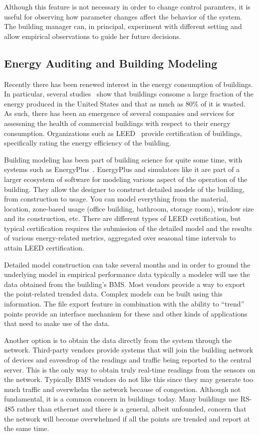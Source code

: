 Although this feature is not necessary in order to change control paramters, it is useful for observing how parameter changes
affect the behavior of the system.  The building manager can, in principal, experiment with different setting and allow
empirical observations to guide her future decisions.


\subsection{Energy Auditing and Building Modeling}
Recently there has been renewed interest in the energy consumption of buildings.  In particular, several studies~\cite{BuildingEnergyData,
MITBuildingScience} show that buildings consome a large fraction of the energy produced in the United States and that as much
as 80\% of it is wasted.  As such, there has been an emergence of several companies and services for assessning the health of
commercial buildings with respect to their energy consumption.  Organizations such as LEED~\cite{Leed} provide certification of 
buildings, specifically rating the energy efficiency of the building.

Building modeling has been part of building science for quite some time, with systems such as EnergyPlus~\cite{eplus}.
EnergyPlus and simulators like it are part of a larger ecosystem of software for modeling various aspect of the operation
of the building.  They allow the designer to construct detailed models of the building, from construction to usage.  You can
model everything from the material, location, zone-based usage (office building, bathroom, storage room), window size and its
construction, etc.  There are different types of LEED certification, but typical certification requires the submission of the detailed
model and the results of various energy-related metrics, aggregated over seasonal time intervals to attain LEED certification.

Detailed model construction can take several months and in order to ground the underlying model in empirical performance data
typically a modeler will use the data obtained from the building's BMS.  Most vendors provide a way to export the point-related 
trended data.  Complex models can be built using this information.  The file export feature in combination with the ability to 
``trend'' points provide an interface mechanism for these and other kinds of applications that need to make use of the data.

Another option is to obtain the data directly from the system through the network.  Third-party vendors provide systems that 
will join the building network of devices and eavesdrop of the readings and traffic being reported to the central server.
This is the only way to obtain truly real-time readings from the sensors on the network.
Typically BMS vendors do not like this since they may generate too much traffic and overwhelm the network because of congestion.
Although not fundamental, it is a common concern in buildings today.  Many buildings use RS-485 rather than ethernet and there is
a general, albeit unfounded, concern that the network will become overwhelmed if all the points are trended and report at the same
time.

